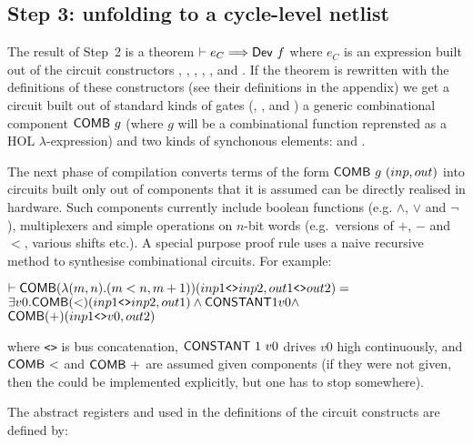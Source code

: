 \vspace*{-3mm}

\subsection*{Step 3: unfolding to a cycle-level netlist}

The result of Step~2 is a theorem
$\vdash e_C \Longrightarrow \mathsf{Dev}~f$ where $e_C$ is an expression built out of the circuit
constructors , 
, , , ,  and . If the theorem
is rewritten with the definitions of these constructors (see their
definitions in the appendix) we get a circuit built out of standard
kinds of gates (, ,  and ) a
generic combinational component $\mathsf{COMB}~g$ (where $g$ will be a
combinational function reprensted as a HOL $\lambda$-expression) and two
kinds of synchonous elements:
 and . 

The next phase of compilation converts terms of the form $\mathsf{COMB}~g~(inp,out)$
into circuits built only out of components that it is assumed can be directly realised in
hardware. Such components  currently include boolean functions (e.g. $\wedge$,
$\vee$ and $\neg$), multiplexers and simple operations  on $n$-bit words (e.g.~versions
of $+$, $-$ and $<$, various shifts etc.). 
A special purpose proof rule uses a naive recursive method to synthesise
combinational circuits. For example:

\vspace*{-2mm}

{\begin{alltt}
\( \vdash \DEF{COMB}({\lambda}(m,n). (m<n, m+1))(inp1\texttt{<>}inp2,out1\texttt{<>}out2) =              \)
\(     {\exists}v0. \DEF{COMB}({<})(inp1\texttt{<>}inp2,out1) \wedge \DEF{CONSTANT} 1 v0 \wedge \)
\(          \DEF{COMB}({+})(inp1\texttt{<>}v0,out2)                                              \)
\end{alltt}}
\vspace*{-2mm}

\noindent where \texttt{<>} is bus concatenation,
$\mathsf{CONSTANT}~1~v0$ drives $v0$ high continuously, and
$\mathsf{COMB}~{<}$ and $\mathsf{COMB}~{+}$ are assumed
given components (if they were not given, then the could be
implemented explicitly, but one has to stop somewhere). 
 
The abstract registers  and  used in the definitions of
the circuit constructs are defined by:

